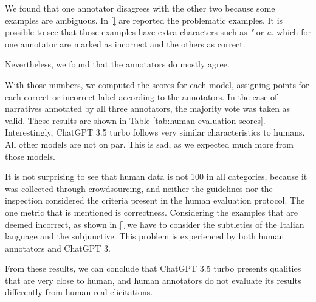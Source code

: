 We found that one annotator disagrees with the other two because some examples are ambiguous. In \ref{} are reported the problematic examples. It is possible to see that those examples have extra characters such as \emph{"} or \emph{a.} which for one annotator are marked as incorrect and the others as correct.

Nevertheless, we found that the annotators do mostly agree.


With those numbers, we computed the scores for each model, assigning points for each correct or incorrect label according to the annotators. In the case of narratives annotated by all three annotators, the majority vote was taken as valid. These results are shown in Table \ref{tab:human-evaluation-scores}.
Interestingly,  ChatGPT 3.5 turbo follows very similar characteristics to humans. All other models are not on par. This is sad, as we expected much more from those models.

It is not surprising to see that human data is not 100 in all categories, because it was collected through crowdsourcing, and neither the guidelines nor the inspection considered the criteria present in the human evaluation protocol. The one metric that is mentioned is correctness. Considering the examples that are deemed incorrect, as shown in \ref{} we have to consider the subtleties of the Italian language and the subjunctive. This problem is experienced by both human annotators and ChatGPT 3.

From these results, we can conclude that ChatGPT 3.5 turbo presents qualities that are very close to human, and human annotators do not evaluate its results differently from human real elicitations. 

